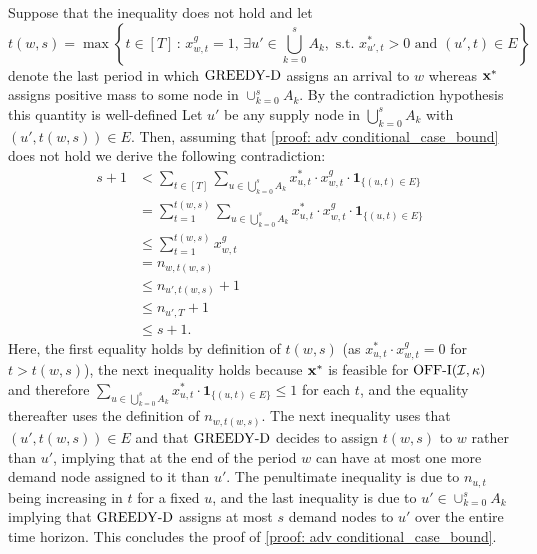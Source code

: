 \begin{enumerate}
        Suppose that the inequality does not hold and let 
        \begin{equation*}
            t(w,s) = \max \left\{ t \in [T] \, : \, x_{w,t}^g = 1, \, \exists u' \in \bigcup_{k=0}^s A_k, \text{ s.t. } x_{u',t}^* > 0 \text{ and } (u',t) \in E\right\}
        \end{equation*}
        denote the last period in which $\mathrm{GREEDY\textrm{-}D}$ assigns an arrival to $w$ whereas $\mathbf{x}^*$ assigns positive mass to some node in $\cup_{k=0}^s A_k$.
        By the contradiction hypothesis this quantity is well-defined 
        Let $u'$ be any supply node in $\bigcup_{k=0}^s A_k$ with $(u', {t(w,s)}) \in E$. Then, assuming that \eqref{proof: adv conditional_case_bound} does not hold we derive the following contradiction:
        \begin{align*}
            s+1 &<\sum_{t \in [T]} \sum_{u \in \bigcup_{k=0}^s A_k} x_{u, t}^* \cdot x_{w,t}^g \cdot \bm{1}_{\{ (u,t) \in E \}}\\
            &=\sum_{t = 1}^{t(w,s)} \sum_{u \in \bigcup_{k=0}^s A_k} x_{u, t}^* \cdot x_{w,t}^g \cdot \bm{1}_{\{ (u,t) \in E \}}\\
            &\leq \sum_{t=1}^{t(w,s)} x_{w,t}^g\\
            &= n_{w, t(w,s)}\\
            &\leq n_{u', t(w,s)} + 1\\
            &\leq n_{u', T} + 1 \\
            &\leq s+1.
        \end{align*}
        Here, the first equality holds by definition of $t(w,s)$ (as $x_{u, t}^* \cdot x_{w, t}^g=0$ for $t>t(w,s)$), the next inequality holds because $\mathbf{x}^*$ is feasible for $\mathrm{\mathrm{OFF}}\textrm{-}\mathrm{I}(\mathcal I,\kappa)$ {and therefore $\sum_{u \in \bigcup_{k=0}^s A_k} x_{u, t}^* \cdot \bm{1}_{\{ (u,t) \in E \}} \leq 1$ for each $t$}, and the equality thereafter uses the definition of $n_{w, t(w,s)}$.  The next inequality uses that $(u',{t(w,s)}) \in E$ and that $\mathrm{GREEDY\textrm{-}D}$ decides to assign $t(w,s)$ to $w$ rather than $u'$, implying that at the end of the period $w$ can have at most one more demand node assigned to it than $u'$.  The penultimate inequality is due to  $n_{u,t}$ being increasing in $t$ for a fixed $u$, and the last inequality is due to $u' \in \cup_{k=0}^s A_k$ implying that $\mathrm{GREEDY\textrm{-}D}$ assigns at most $s$ demand nodes to $u'$ over the entire time horizon. This concludes the proof of  \eqref{proof: adv conditional_case_bound}.
    \end{enumerate}
    
